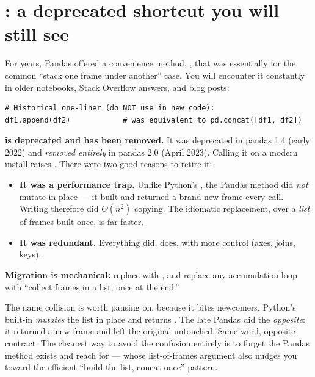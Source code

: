 \documentclass[11pt]{article}
\begin{document}
\section{\texorpdfstring{}{DataFrame.append}: a deprecated shortcut you will still see}

For years, Pandas offered a convenience method, , that was essentially  for the common ``stack one frame under another'' case. You will encounter it constantly in older notebooks, Stack Overflow answers, and blog posts:

\begin{lstlisting}
# Historical one-liner (do NOT use in new code):
df1.append(df2)            # was equivalent to pd.concat([df1, df2])
\end{lstlisting}

\begin{pitfall}
\textbf{ is deprecated and has been removed.} It was deprecated in pandas 1.4 (early 2022) and \emph{removed entirely} in pandas 2.0 (April 2023). Calling it on a modern install raises . There were two good reasons to retire it:
\begin{itemize}
  \item \textbf{It was a performance trap.} Unlike Python's , the Pandas method did \emph{not} mutate in place --- it built and returned a brand-new frame every call. Writing  therefore did $O(n^2)$ copying. The idiomatic replacement,  over a \emph{list} of frames built once, is far faster.
  \item \textbf{It was redundant.} Everything  did,  does, with more control (axes, joins, keys).
\end{itemize}
\textbf{Migration is mechanical:} replace  with , and replace any accumulation loop with ``collect frames in a list,  once at the end.''
\end{pitfall}

\begin{pyrefresh}
The name collision is worth pausing on, because it bites newcomers. Python's built-in  \emph{mutates} the list in place and returns . The late Pandas  did the \emph{opposite}: it returned a new frame and left the original untouched. Same word, opposite contract. The cleanest way to avoid the confusion entirely is to forget the Pandas method exists and reach for  --- whose list-of-frames argument also nudges you toward the efficient ``build the list, concat once'' pattern.
\end{pyrefresh}
\end{document}
